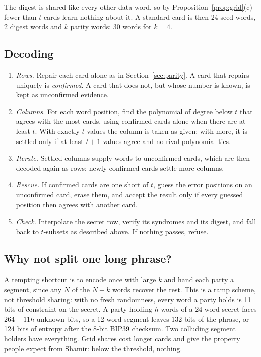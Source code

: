 \documentclass[numeric]{anvil-paper}
\begin{document}
The digest is shared like every other data word, so by
Proposition~\ref{prop:grid}(c) fewer than $t$ cards learn nothing about it. A
standard card is then 24 seed words, 2 digest words and $k$ parity words:
30 words for $k=4$.

\subsection{Decoding}
\label{sec:decoder}

\begin{enumerate}
\item \emph{Rows.} Repair each card alone as in Section~\ref{sec:parity}. A
  card that repairs uniquely is \emph{confirmed}. A card that does not, but
  whose number is known, is kept as unconfirmed evidence.
\item \emph{Columns.} For each word position, find the polynomial of degree
  below $t$ that agrees with the most cards, using confirmed cards alone when
  there are at least $t$. With exactly $t$ values the column is taken as given;
  with more, it is settled only if at least $t+1$ values agree and no rival
  polynomial ties.
\item \emph{Iterate.} Settled columns supply words to unconfirmed cards, which
  are then decoded again as rows; newly confirmed cards settle more columns.
\item \emph{Rescue.} If confirmed cards are one short of $t$, guess the error
  positions on an unconfirmed card, erase them, and accept the result only if
  every guessed position then agrees with another card.
\item \emph{Check.} Interpolate the secret row, verify its syndromes and its
  digest, and fall back to $t$-subsets as described above. If nothing passes,
  refuse.
\end{enumerate}

\subsection{Why not split one long phrase?}
\label{sec:ramp}

A tempting shortcut is to encode once with large $k$ and hand each party a
segment, since any $N$ of the $N+k$ words recover the rest. This is a ramp
scheme, not threshold sharing: with no fresh randomness, every word a party
holds is 11 bits of constraint on the secret. A party holding $h$ words of a
24-word secret faces $264-11h$ unknown bits, so a 12-word segment leaves 132
bits of the phrase, or 124 bits of entropy after the 8-bit BIP39 checksum.
Two colluding segment holders have everything. Grid shares cost longer cards
and give the property people expect from Shamir: below the threshold, nothing.
\end{document}
